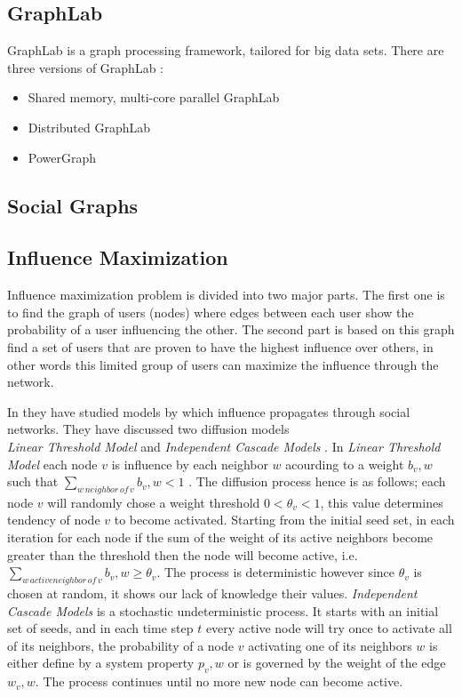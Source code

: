 \documentclass[english]{tktltiki}
\begin{document}
\subsection{GraphLab}
GraphLab is a graph processing framework, tailored for big data sets. There are three versions of GraphLab :
\begin{itemize}
\item
Shared memory, multi-core parallel GraphLab
\item
Distributed GraphLab
\item
PowerGraph

\end{itemize} 


\subsection{Social Graphs}

\subsection{Influence Maximization}
Influence maximization problem is divided into two major parts. The first one is to find the graph of users (nodes) where edges between each user show the probability of  a user influencing the other. The second part is
based on this graph find a set of users that are proven to have the highest influence over others, in other words 
this limited group of users can maximize the influence through the network.

In \cite{kempe03} they have studied models by which influence propagates through social networks. They have discussed two diffusion models \\
\textit{Linear Threshold Model} and \textit{Independent Cascade Models} . In \textit{Linear Threshold Model} each node $v$ is influence by each neighbor $w$ acourding to a weight $b_v,w$ such that $\sum \nolimits_{w \, neighbor \, of \, v} b_v,w < 1$ . The diffusion process hence is as follows; each node $v$ will randomly chose a weight threshold $0 < \theta_v<1 $, this value determines tendency of node $v$ to become activated. Starting from the initial seed set, in each iteration for each node if the sum of the weight of its active neighbors become greater than the threshold then the node will become active, i.e. $\sum \nolimits_{w \, active neighbor \, of \, v} b_v,w  \geq \theta_v $. The process is deterministic however since $\theta_v$ is chosen at random, it shows our lack of knowledge their values. \textit{Independent Cascade Models} is a stochastic undeterministic process. It starts with an initial set of seeds, and in each time step $t$ every active node will try once to activate all of its neighbors, the probability of a node $v$ activating one of its neighbors $w$ is either define by a system property $p_v,w$ or is governed by the weight of the edge $w_v,w$. The process continues until no more new node can become active. 
\end{document}

